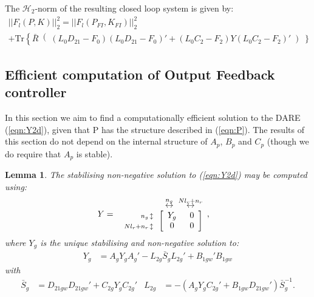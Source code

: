 \documentclass[a4paper,12pt]{article}
\newtheorem{lem}[thm]{Lemma}
\theoremstyle{remark}
\newcommand{\arr}[2]{
        \begin{array}{#1}
        #2
        \end{array}}
\newcommand{\nrm}[1]{\left|\left| #1 \right|\right|}
\newcommand{\ma}[1]{\begin{bmatrix} #1 \end{bmatrix}}
\newcommand{\als}[1]{\begin{align*} #1 \end{align*}}
\newcommand{\mls}[1]{\begin{multline*} #1 \end{multline*}}
\newcommand{\aln}[1]{\begin{align} #1 \end{align}}
\newcommand{\tra}[1]{\textrm{Tr}\left\{ #1 \right\}}
\newcommand{\htwo}{\mathcal H_2}
\begin{document}
The $\htwo$-norm of the resulting closed loop system is given by:
\mls{\nrm{F_l(P,K)}_2^2=\nrm{F_l(P_{FI},K_{FI})}_2^2\\
	+\tra{\bar R\right( (L_0D_{21}-F_0)(L_0D_{21}-F_0)' +(L_0C_2-F_2)Y(L_0C_2-F_2)'\left) }}


\subsection{Efficient computation of Output Feedback controller}
In this section we aim to find a computationally efficient solution to the DARE (\ref{eqn:Y2d}), given that P has the structure described in (\ref{eqn:P}). The results of this section do not depend on the internal structure of $A_p$, $B_p$ and $C_p$ (though we do require that $A_p$ is stable).

\begin{lem} 
The stabilising non-negative solution to (\ref{eqn:Y2d}) may be computed using:
\als{
Y&=
	\arr{r}{
	\stackrel{n_g}{\leftrightarrow}\hspace{0.2cm}
	\stackrel{Nl_r+n_r}{\leftrightarrow}\hspace{0cm}\\
	\arr{r}{
	\scriptstyle{n_g} \,\updownarrow\\
	\scriptstyle{Nl_r+n_r} \,\updownarrow}
	\ma{\arr{cc}{ Y_{g} & \hspace{0.2cm}0 \\ 0&\hspace{0.2cm}0}}
	}
,}
where $Y_g$ is the unique stabilising and non-negative solution to:
\aln{
Y_g&=A_gY_gA_g'-L_{2g} {\bar S_g}L_{2g}'+B_{1gw}'B_{1gw} \label{eqn:Y2g}}
with
\als{
\bar S_g&=D_{21gw}D_{21gw}'+C_{2g}Y_gC_{2g}' &  
	L_{2g}&=-(A_gY_gC_{2g}'+B_{1gw}D_{21gw}')\bar S_g^{-1}\nonumber.
}
\end{lem}
\end{document}
